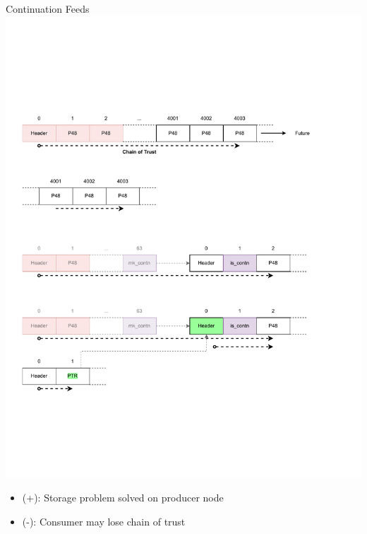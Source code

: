 \documentclass[aspectratio=169]{beamer}
\begin{document}
\begin{frame}[c]{Continuation Feeds}
\includegraphics[width=1\textwidth]{images/session_3.pdf}
\begin{itemize}
	\item (+): Storage problem solved on producer node
	\item (-): Consumer may lose chain of trust
\end{itemize}
\end{frame}
\end{document}
